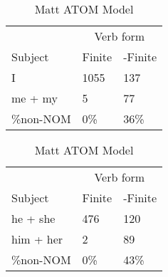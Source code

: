 \begin{table}[]
\caption{Matt ATOM Model}
\begin{minipage}{0.5\textwidth}
    \centering
    \begin{tabular}{@{}lll@{}}
        \toprule
         & \multicolumn{2}{c}{Verb form}\\
         \cline{2-3}
        Subject & Finite & -Finite \\
        \midrule
        I & 1055 & 137 \\
        me + my & 5 & 77 \\
        \hline
        \%non-NOM & 0\% & 36\% \\
        \bottomrule
    \end{tabular}
\end{minipage}
\begin{minipage}{0.5\textwidth}
    \centering
    \begin{tabular}{@{}lll@{}}
        \toprule
         & \multicolumn{2}{c}{Verb form}\\
         \cline{2-3}
        Subject & Finite & -Finite \\
        \midrule
        he + she & 476 & 120 \\
        him + her & 2 & 89 \\
        \hline
        \%non-NOM & 0\% & 43\% \\
        \bottomrule
    \end{tabular}
    \end{minipage}


\end{table}
